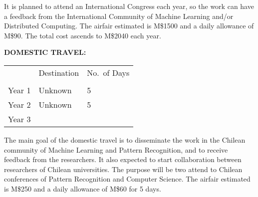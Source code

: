 \documentclass[10pt]{article}
\begin{document}
\vspace{15pt}

\begin{comment}
En este proyecto se planifica asistir a Congresos Internacionales cada año, para así recibir retroalimentación de la Comunidad Internacional de Machine Learning, Descubrimiento de Conocimiento desde Grandes Bases de Datos y Computación Distribuida. El costo estimado de vuelo es de M\$1500 y el viatico diario es de M\$90. El costo total por año asciende a M\$2040.
\end{comment}

It is planned to attend an International Congress each year, so the work can have a feedback from the International Community of Machine Learning and/or Distributed Computing. The airfair estimated is M\$1500 and a daily allowance of M\$90. The total cost ascends to M\$2040 each year.


\vspace{15pt}

\textbf{\uppercase{DOMESTIC TRAVEL:}}
\vspace{15pt}

\begin{tabular}{l|l|l|}
\cline{2-3}
                             & Destination & No.\ of Days \\ \cline{2-3} 
                             &             &             \\ \hline
\multicolumn{1}{|l|}{Year 1} &   Unknown          &     5        \\ \hline
\multicolumn{1}{|l|}{Year 2} &      Unknown       &     5        \\ \hline
\multicolumn{1}{|l|}{Year 3} &          &           \\ \hline
\end{tabular}
\vspace{15pt}

The main goal of the domestic travel is to disseminate the work in the Chilean community of Machine Learning and Pattern Recognition, and to receive feedback from the researchers. It also expected to start collaboration between researchers of Chilean universities. The purpose will be two attend to Chilean conferences of Pattern Recognition and Computer Science. The airfair estimated is M\$250 and a daily allowance of M\$60 for 5 days.
\end{document}
